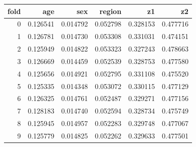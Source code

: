 \begin{tabular}{rrrrrr}
\toprule
fold & age & sex & region & z1 & z2 \\
\midrule
0 & 0.126541 & 0.014792 & 0.052798 & 0.328153 & 0.477716 \\
1 & 0.126781 & 0.014730 & 0.053308 & 0.331031 & 0.474151 \\
2 & 0.125949 & 0.014822 & 0.053323 & 0.327243 & 0.478663 \\
3 & 0.126669 & 0.014459 & 0.052539 & 0.328753 & 0.477580 \\
4 & 0.125656 & 0.014921 & 0.052795 & 0.331108 & 0.475520 \\
5 & 0.125335 & 0.014348 & 0.053072 & 0.330115 & 0.477129 \\
6 & 0.126325 & 0.014761 & 0.052487 & 0.329271 & 0.477156 \\
7 & 0.128183 & 0.014740 & 0.052594 & 0.328734 & 0.475749 \\
8 & 0.125945 & 0.014957 & 0.052283 & 0.329748 & 0.477067 \\
9 & 0.125779 & 0.014825 & 0.052262 & 0.329633 & 0.477501 \\
\bottomrule
\end{tabular}
